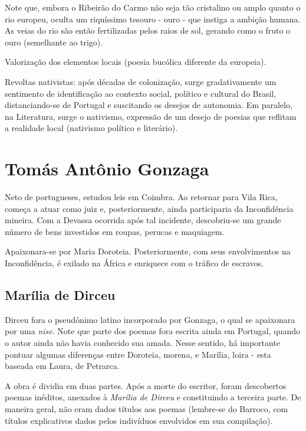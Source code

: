 Note que, embora o Ribeirão do Carmo não seja tão cristalino ou amplo quanto o rio europeu, oculta um riquíssimo tesouro - ouro - que instiga a ambição humana. As veias do rio são então fertilizadas pelos raios de sol, gerando como o fruto o ouro (semelhante ao trigo).

Valorização dos elementos locais (poesia bucólica diferente da europeia).

Revoltas nativistas: após décadas de colonização, surge gradativamente um sentimento de identificação ao contexto social, político e cultural do Brasil, distanciando-se de Portugal e suscitando os desejos de autonomia. Em paralelo, na Literatura, surge o nativismo, expressão de um desejo de poesias que reflitam a realidade local (nativismo político e literário).

\section{Tomás Antônio Gonzaga}

Neto de portugueses, estudou leis em Coimbra. Ao retornar para Vila Rica, começa a atuar como juiz e, posteriormente, ainda participaria da Inconfidência mineira. Com a Devassa ocorrida após tal incidente, descobriu-se um grande número de bens investidos em roupas, perucas e maquiagem.

Apaixonara-se por Maria Doroteia. Posteriormente, com seus envolvimentos na Inconfidência, é exilado na África e enriquece com o tráfico de escravos.

\subsection{Marília de Dirceu}

Dirceu fora o pseudônimo latino incorporado por Gonzaga, o qual se apaixonara por uma \textit{nise}. Note que parte dos poemas fora escrita ainda em Portugal, quando o autor ainda não havia conhecido sua amada. Nesse sentido, há importante pontuar algumas diferenças entre Doroteia, morena, e Marília, loira - esta baseada em Laura, de Petrarca.

A obra é dividia em duas partes. Após a morte do escritor, foram descobertos poemas inéditos, anexados à \textit{Marília de Dirceu} e constituindo a terceira parte. De maneira geral, não eram dados títulos aos poemas (lembre-se do Barroco, com títulos explicativos dados pelos indivíduos envolvidos em sua compilação).

